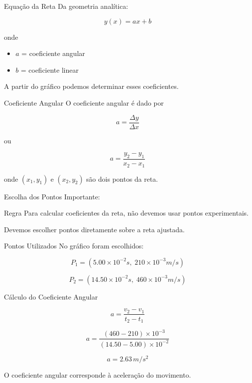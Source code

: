 \documentclass[aspectratio=169]{beamer}
\begin{document}
\begin{frame}{Equação da Reta}
Da geometria analítica:

\begin{equation}
y(x) = ax + b
\end{equation}

onde

\begin{itemize}
\item $a$ = coeficiente angular
\item $b$ = coeficiente linear
\end{itemize}

A partir do gráfico podemos determinar esses coeficientes.
\end{frame}


\begin{frame}{Coeficiente Angular}
O coeficiente angular é dado por

\begin{equation}
a = \frac{\Delta y}{\Delta x}
\end{equation}

ou

\begin{equation}
a = \frac{y_2-y_1}{x_2-x_1}
\end{equation}

onde $(x_1,y_1)$ e $(x_2,y_2)$ são dois pontos da reta.
\end{frame}


\begin{frame}{Escolha dos Pontos}
Importante:

\begin{block}{Regra}
Para calcular coeficientes da reta, não devemos usar pontos experimentais.
\end{block}

Devemos escolher pontos diretamente sobre a reta ajustada.
\end{frame}


\begin{frame}{Pontos Utilizados}
No gráfico foram escolhidos:

\[
P_1=(5.00\times10^{-2}s,\;210\times10^{-3}m/s)
\]

\[
P_2=(14.50\times10^{-2}s,\;460\times10^{-3}m/s)
\]
\end{frame}


\begin{frame}{Cálculo do Coeficiente Angular}

\[
a=\frac{v_2-v_1}{t_2-t_1}
\]

\[
a=\frac{(460-210)\times10^{-3}}{(14.50-5.00)\times10^{-2}}
\]

\[
a=2.63\,m/s^2
\]

\bigskip

O coeficiente angular corresponde à aceleração do movimento.
\end{frame}
\end{document}
